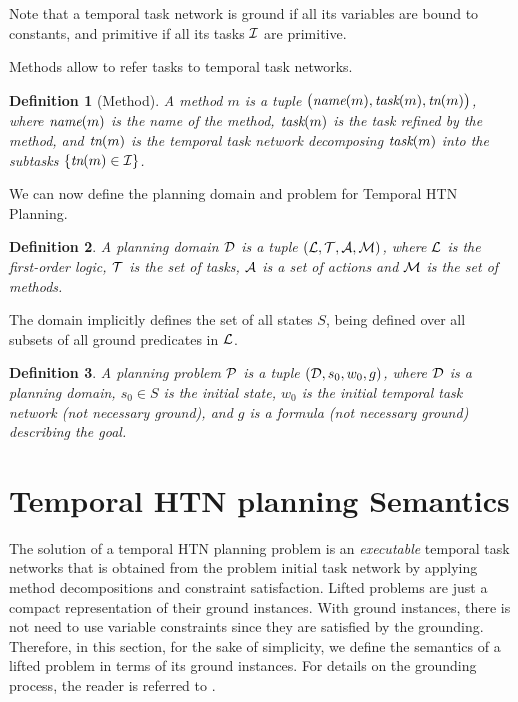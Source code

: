 \documentclass[letterpaper]{article} %
\newtheorem{definition}{Definition}
\newcommand{\name}{\text{\it name}}
\newcommand{\task}{\text{\it task}}
\newcommand{\tn}{\text{\it tn}}
\begin{document}
Note that a temporal task network is ground if all its variables are bound to constants, and primitive if all its tasks ${\cal{I}}$ are primitive.

Methods allow to refer tasks to temporal task networks.
\begin{definition}[Method]
A {\em method} $m$ is a tuple $\bigl(\name(m), \task(m), \tn(m)\bigr)$, where $\name(m)$ is the name of the method, $\task(m)$ is the task refined by the method, and $\tn(m)$ is the temporal task network decomposing $\task(m)$ into the subtasks $\{\tn(m) \in \cal{I}\}$.
\end{definition}
 We can now define the planning domain and problem for Temporal HTN Planning.
\begin{definition}
 A {\em planning domain} $\cal{D}$ is a tuple $({\cal{L}}, {\cal{T}}, {\cal{A}}, {\cal{M}})$, where $\cal{L}$ is the first-order logic, $\cal{T}$ is the set of tasks, ${\cal{A}}$ is a set of actions and $\cal{M}$ is the set of methods. %
 \end{definition}

 The domain implicitly defines the set of all states $S$, being defined over all subsets of all ground predicates in $\cal{L}$.

 \begin{definition}
 A {\em planning problem} $\cal{P}$ is a tuple $({\cal{D}}, {s_0}, w_0, g)$, where $\cal{D}$ is a planning domain, $s_0 \in S$ is the initial state, $w_0$ is the initial temporal task network (not necessary ground), and $g$ is a formula (not necessary ground) describing the goal.
 \end{definition}

 \section{Temporal HTN planning Semantics}
 \label{THTN}

 The solution of a temporal HTN planning problem is an {\it executable} temporal task networks that is obtained from the problem initial task network by applying method decompositions and constraint satisfaction. Lifted problems are just a compact representation of their ground instances. With ground instances, there is not need to use variable constraints since they are satisfied by the grounding. Therefore, in this section, for the sake of simplicity, we define the semantics of a lifted problem in terms of its ground instances. For details on the grounding process, the reader is referred to \cite{behnke20,ramoul17}.
\end{document}
